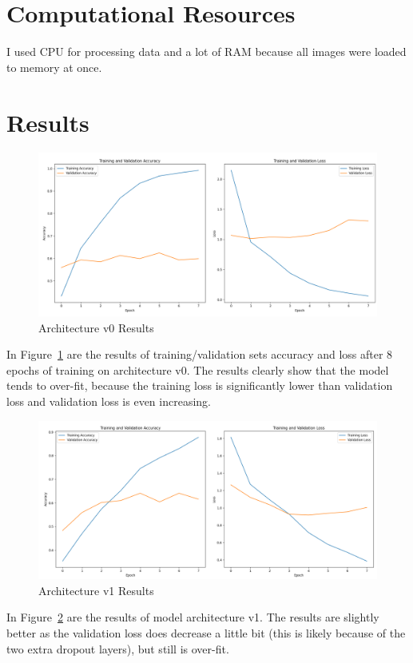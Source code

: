 \documentclass{article}
\begin{document}
\section*{Computational Resources}
I used CPU for processing data and a lot of RAM because all images were loaded to memory at once.

\section*{Results}
\begin{figure}[H]
    \centering
    \includegraphics[width=1\textwidth]{results-0.png}
    \caption{Architecture v0 Results}
    \label{fig:results-0}
\end{figure}
In Figure~\ref{fig:results-0} are the results of training/validation sets accuracy and loss after 8 epochs of training on architecture v0. The results clearly show that the model tends to over-fit, because the training loss is significantly lower than validation loss and validation loss is even increasing.
\begin{figure}[H]
    \centering
    \includegraphics[width=1\textwidth]{results-1.png}
    \caption{Architecture v1 Results}
    \label{fig:results-1}
\end{figure}
In Figure~\ref{fig:results-1} are the results of model architecture v1. The results are slightly better as the validation loss does decrease a little bit (this is likely because of the two extra dropout layers), but still is over-fit.
\end{document}
